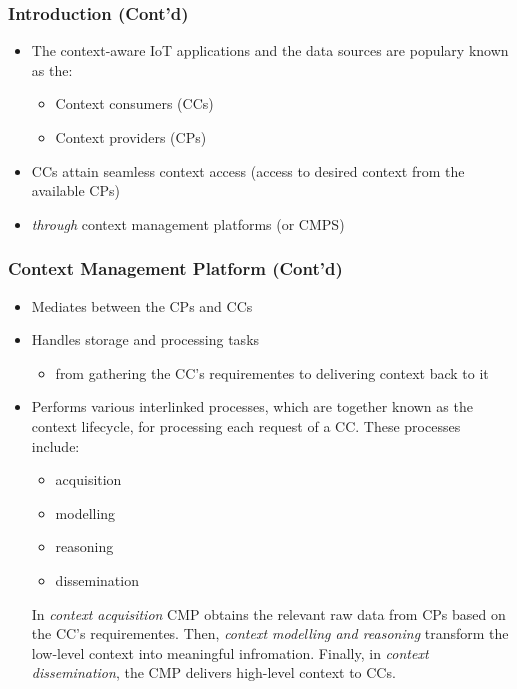 \documentclass{../iot-lecture}
\begin{document}
\begin{frame}
  \frametitle{Introduction  (Cont'd)}
  \begin{itemize}
    \item The context-aware IoT applications and the data sources are populary known as the:
    \begin{itemize}
      \item Context consumers (CCs)
      \item Context providers (CPs)
    \end{itemize}
    \item CCs attain seamless context access (access to desired context from the available CPs)
    \item \textit{\color{YellowOrange} through} context management platforms (or CMPS)
  \end{itemize}
\end{frame}

\begin{frame}
  \frametitle{Context Management Platform  (Cont'd)}
  \begin{itemize}
    \item Mediates between the CPs and CCs
    \item Handles storage and processing tasks
    \begin{itemize}
      \item from gathering the CC's requirementes to delivering context back to it
    \end{itemize}
    \item Performs various interlinked processes, which are together known as the context lifecycle, for processing each request of a CC. These processes include:
    \begin{itemize}
      \item acquisition
      \item modelling
      \item reasoning
      \item dissemination
    \end{itemize}
    \begin{block}{}
      In \textit{context acquisition} CMP obtains the relevant raw data from CPs based on the CC's requirementes.
      Then, \textit{context modelling and reasoning} transform the low-level context into meaningful infromation.
      Finally, in \textit{context dissemination}, the CMP delivers high-level context to CCs.
    \end{block}
  \end{itemize}
\end{frame}
\end{document}
